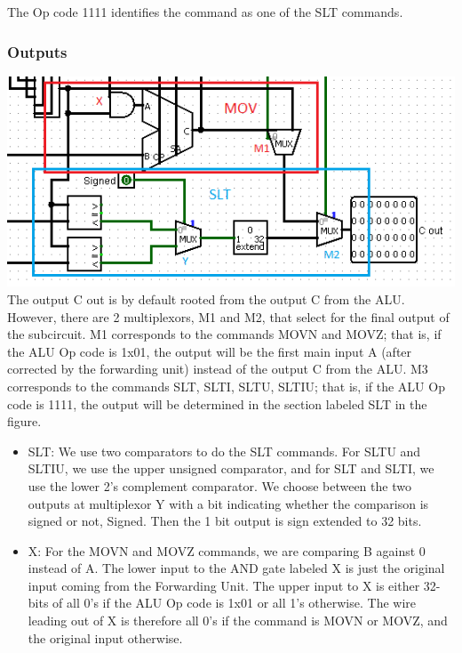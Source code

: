 \documentclass{article}
\begin{document}
 The Op code 1111 identifies the command as one of the SLT commands.

\subsubsection{Outputs}
\includegraphics{OUTPUT.png}
The output C out is by default rooted from the output C from the ALU. However, there are 2 multiplexors, M1 and M2, that select for the final output of the subcircuit. M1 corresponds to the commands MOVN and MOVZ; that is, if the ALU Op code is 1x01, the output will be the first main input A (after corrected by the forwarding unit) instead of the output C from the ALU. M3 corresponds to the commands SLT, SLTI, SLTU, SLTIU; that is, if the ALU Op code is 1111, the output will be determined in the section labeled SLT in the figure. 
\begin{itemize}
\item
SLT: We use two comparators to do the SLT commands. For SLTU and SLTIU, we use the upper unsigned comparator, and for SLT and SLTI, we use the lower 2's complement comparator. We choose between the two outputs at multiplexor Y with a bit indicating whether the comparison is signed or not, Signed. Then the 1 bit output is sign extended to 32 bits. 

\item
X: For the MOVN and MOVZ commands, we are comparing B against 0 instead of A. The lower input to the AND gate labeled X is just the original input coming from the Forwarding Unit. The upper input to X is either 32-bits of all 0's if the ALU Op code is 1x01 or all 1's otherwise. The wire leading out of X is therefore all 0's if the command is MOVN or MOVZ, and the original input otherwise.

\end{itemize}
\end{document}
